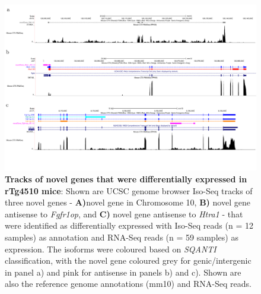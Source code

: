\begin{landscape}
	\begin{figure}[!htp]
		\centering
		\includegraphics[page=1,trim={0 4cm 0 0}, scale = 0.45]{Figures/TracksFigures_Diff.pdf}
		\captionsetup{width=1.4\textwidth}
		\caption[Tracks of novel genes that were differentially expressed in rTg4510 mice]%
		{\textbf{Tracks of novel genes that were differentially expressed in rTg4510 mice}: Shown are UCSC genome browser Iso-Seq tracks of three novel genes - \textbf{A)}novel gene in Chromosome 10, \textbf{B)} novel gene antisense to \textit{Fgfr1op}, and \textbf{C)} novel gene antisense to \textit{Htra1} - that were identified as differentially expressed with Iso-Seq reads (n = 12 samples) as annotation and RNA-Seq reads (n = 59 samples) as expression. The isoforms were coloured based on \textit{SQANTI} classification, with the novel gene coloured grey for genic/intergenic in panel a) and pink for antisense in panels b) and c). Shown are also the reference genome annotations (mm10) and RNA-Seq reads.}   
		\label{fig:whole_novelgene_difftracks}
	\end{figure}
\end{landscape}

